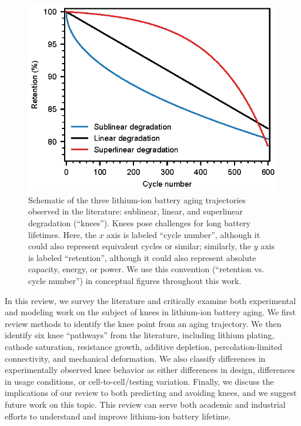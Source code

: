 \documentclass[journal=jpcl, manuscript=article, layout=onecolumn]{achemso}
\begin{document}
\begin{figure}[ht]
\centering
\includegraphics[scale=1]{figures/degradation_rates.eps}
\caption{Schematic of the three lithium-ion battery aging trajectories observed in the literature: sublinear, linear, and superlinear degradation (``knees''). Knees pose challenges for long battery lifetimes. Here, the $x$ axis is labeled ``cycle number'', although it could also represent equivalent cycles or similar; similarly, the $y$ axis is labeled ``retention'', although it could also represent absolute capacity, energy, or power. We use this convention (``retention vs. cycle number'') in conceptual figures throughout this work.}
\label{fig:degradation_shapes}
\end{figure}


In this review, we survey the literature and critically examine both experimental and modeling work on the subject of knees in lithium-ion battery aging. We first review methods to identify the knee point from an aging trajectory. We then identify six knee ``pathways'' from the literature, including lithium plating, cathode saturation, resistance growth, additive depletion, percolation-limited connectivity, and mechanical deformation. We also classify differences in experimentally observed knee behavior as either differences in design, differences in usage conditions, or cell-to-cell/testing variation. Finally, we discuss the implications of our review to both predicting and avoiding knees, and we suggest future work on this topic. This review can serve both academic and industrial efforts to understand and improve lithium-ion battery lifetime.
\end{document}
